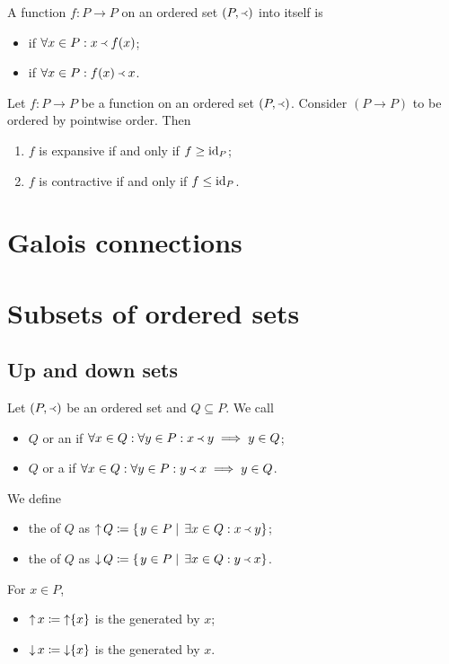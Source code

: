 \begin{definition}
A function $f: P\to P$ on an ordered set $(P,\Yleft)$ into itself is
\begin{itemize}
\item {} if $\forall x\in P: x\Yleft f(x)$;
\item {} if $\forall x\in P: f(x)\Yleft x$.
\end{itemize}
\end{definition}

\begin{lemma}
Let $f:P\to P$ be a function on an ordered set $(P,\Yleft)$. Consider $(P\to P)$ to be ordered by pointwise order. Then
\begin{enumerate}
\item $f$ is expansive \textup{if and only if} $f \geq \operatorname{id}_P$;
\item $f$ is contractive \textup{if and only if} $f \leq \operatorname{id}_P$.
\end{enumerate}
\end{lemma}

\section{Galois connections}


\section{Subsets of ordered sets}
\subsection{Up and down sets}
\begin{definition}
Let $\left( P, \Yleft \right)$ be an ordered set and $Q\subseteq P$. We call
\begin{itemize}
\item $Q$  or an  if $\forall x\in Q: \forall y\in P: x\Yleft y \implies y\in Q$;
\item $Q$  or a  if $\forall x\in Q: \forall y\in P: y\Yleft x \implies y\in Q$.
\end{itemize}
We define
\begin{itemize}
\item the  of $Q$ as $\mathop{\uparrow} Q \coloneqq \left\{\left. y\in P \;\right|\; \exists x\in Q: x\Yleft y \right\}$;
\item the  of $Q$ as $\mathop{\downarrow} Q \coloneqq \left\{\left. y\in P \;\right|\; \exists x\in Q: y\Yleft x \right\}$.
\end{itemize}
For $x\in P$,
\begin{itemize}
\item $\mathop{\uparrow} x \coloneqq \mathop{\uparrow}\{x\}$ is the  generated by $x$;
\item $\mathop{\downarrow} x \coloneqq \mathop{\downarrow}\{x\}$ is the  generated by $x$.
\end{itemize}
\end{definition}



